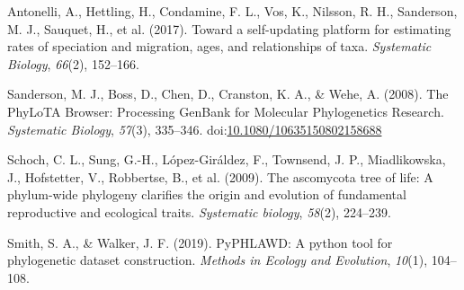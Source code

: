 \documentclass[10pt,a4paper,onecolumn]{article}
\begin{document}
\hypertarget{refs}{}
\leavevmode\hypertarget{ref-antonelli2017toward}{}%
Antonelli, A., Hettling, H., Condamine, F. L., Vos, K., Nilsson, R. H.,
Sanderson, M. J., Sauquet, H., et al. (2017). Toward a self-updating
platform for estimating rates of speciation and migration, ages, and
relationships of taxa. \emph{Systematic Biology}, \emph{66}(2),
152--166.

\leavevmode\hypertarget{ref-sanderson2008phylota}{}%
Sanderson, M. J., Boss, D., Chen, D., Cranston, K. A., \& Wehe, A.
(2008). The PhyLoTA Browser: Processing GenBank for Molecular
Phylogenetics Research. \emph{Systematic Biology}, \emph{57}(3),
335--346.
doi:\href{https://doi.org/10.1080/10635150802158688}{10.1080/10635150802158688}

\leavevmode\hypertarget{ref-schoch2009ascomycota}{}%
Schoch, C. L., Sung, G.-H., López-Giráldez, F., Townsend, J. P.,
Miadlikowska, J., Hofstetter, V., Robbertse, B., et al. (2009). The
ascomycota tree of life: A phylum-wide phylogeny clarifies the origin
and evolution of fundamental reproductive and ecological traits.
\emph{Systematic biology}, \emph{58}(2), 224--239.

\leavevmode\hypertarget{ref-smith2019pyphlawd}{}%
Smith, S. A., \& Walker, J. F. (2019). PyPHLAWD: A python tool for
phylogenetic dataset construction. \emph{Methods in Ecology and
Evolution}, \emph{10}(1), 104--108.
\end{document}
